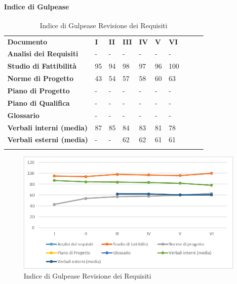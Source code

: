 		\paragraph{Indice di Gulpease}\mbox{} %
			\begin{longtable} {						
				>{}p{50mm}  		
				>{}p{8mm}		
				>{}p{8mm}		
				>{}p{8mm}		
				>{}p{8mm}		
				>{}p{8mm}		
				>{}p{8mm}
				>{}p{8mm}
				>{}p{8mm}
				>{}p{8mm}				
			}			
			\rowcolor{gray!50}
			\textbf{Documento} & \textbf{I} & \textbf{II} & \textbf{III} & \textbf{IV} & \textbf{V} & \textbf{VI} \TBstrut \\ [2mm]
			\textbf{Analisi dei Requisiti} & - & - & - & - & - & - \TBstrut \\ [2mm]
			\textbf{Studio di Fattibilità} & 95 & 94 & 98 & 97 & 96 & 100 \TBstrut \\ [2mm]
			\textbf{Norme di Progetto} & 43 & 54 & 57 & 58 & 60 & 63 \TBstrut \\ [2mm]
			\textbf{Piano di Progetto} & - & - & - & - & - & - \TBstrut \\ [2mm]
			\textbf{Piano di Qualifica} & - & - & - & - & - & - \TBstrut \\ [2mm]
			\textbf{Glossario} & - & - & - & - & - & - \TBstrut \\ [2mm]
			\textbf{Verbali interni (media)} & 87 & 85 & 84 & 83 & 81 & 78 \TBstrut \\ [2mm]
			\textbf{Verbali esterni (media)} & - & - & 62 & 62 & 61 & 61 \TBstrut \\ [2mm]
			\rowcolor{white}
			\caption{Indice di Gulpease Revisione dei Requisiti}
		\end{longtable}
	\begin{figure}[H] 	
		\includegraphics[width=\linewidth]{./img/grafici/2.png}	
		\caption{Indice di Gulpease Revisione dei Requisiti}	
	\end{figure}
		
